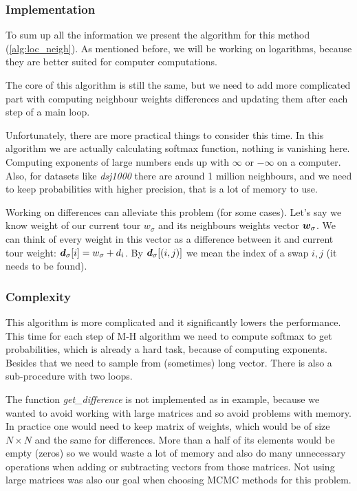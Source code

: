 	\subsubsection{Implementation}
	
		To sum up all the information we present the algorithm for this method (\ref{alg:loc_neigh}). As mentioned before, we will be working on logarithms, because they are better suited for computer computations.

		The core of this algorithm is still the same, but we need to add more complicated part with computing neighbour weights differences and updating them after each step of a main loop.
		
		Unfortunately, there are more practical things to consider this time. In this algorithm we are actually calculating softmax function, nothing is vanishing here. Computing exponents of large numbers ends up with $\infty$ or $-\infty$ on a computer. Also, for datasets like \textit{dsj1000} there are around 1 million neighbours, and we need to keep probabilities with higher precision, that is a lot of memory to use.
		
		Working on differences can alleviate this problem (for some cases). Let's say we know weight of our current tour $w_\sigma$ and its neighbours weights vector $\bm{w}_\sigma$. We can think of every weight in this vector as a difference between it and current tour weight: $\bm{d}_{\sigma}[i] = w_\sigma + d_i$. By $\bm{d}_\sigma[(i,j)]$ we mean the index of a swap $i,j$ (it needs to be found).
		
		
		
	\subsubsection{Complexity}
		This algorithm is more complicated and it significantly lowers the performance. This time for each step of M-H algorithm we need to compute softmax to get probabilities, which is already a hard task, because of computing exponents. Besides that we need to sample from (sometimes) long vector. There is also a sub-procedure with two loops.
		
		The function \textit{get\_difference} is not implemented as in example, because we wanted to avoid working with large matrices and so avoid problems with memory. In practice one would need to keep matrix of weights, which would be of size $N \times N$ and the same for differences. More than a half of its elements would be empty (zeros) so we would waste a lot of memory and also do many unnecessary operations when adding or subtracting vectors from those matrices. Not using large matrices was also our goal when choosing MCMC methods for this problem.
		
